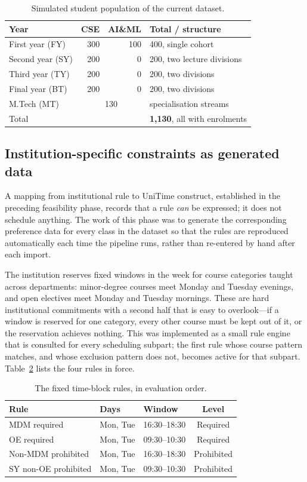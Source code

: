 \documentclass[journal]{IEEEtran}
\begin{document}
\begin{table}[t]
\centering
\caption{Simulated student population of the current dataset.}
\label{tab:population}
\footnotesize
\begin{tabular}{@{}lrrl@{}}
\toprule
Year & CSE & AI\&ML & Total / structure \\
\midrule
First year (FY) & 300 & 100 & 400, single cohort \\
Second year (SY) & 200 & 0 & 200, two lecture divisions \\
Third year (TY) & 200 & 0 & 200, two divisions \\
Final year (BT) & 200 & 0 & 200, two divisions \\
M.Tech (MT) & \multicolumn{2}{c}{130} & specialisation streams \\
\midrule
Total & \multicolumn{2}{c}{} & \textbf{1{,}130}, all with enrolments \\
\bottomrule
\end{tabular}
\end{table}

\subsection{Institution-specific constraints as generated data}
A mapping from institutional rule to UniTime construct, established in the preceding feasibility phase, records that a rule \emph{can} be expressed; it does not schedule anything. The work of this phase was to generate the corresponding preference data for every class in the dataset so that the rules are reproduced automatically each time the pipeline runs, rather than re-entered by hand after each import.

The institution reserves fixed windows in the week for course categories taught across departments: minor-degree courses meet Monday and Tuesday evenings, and open electives meet Monday and Tuesday mornings. These are hard institutional commitments with a second half that is easy to overlook---if a window is reserved for one category, every other course must be kept out of it, or the reservation achieves nothing. This was implemented as a small rule engine that is consulted for every scheduling subpart; the first rule whose course pattern matches, and whose exclusion pattern does not, becomes active for that subpart. Table~\ref{tab:blocks} lists the four rules in force.

\begin{table}[t]
\centering
\caption{The fixed time-block rules, in evaluation order.}
\label{tab:blocks}
\footnotesize
\begin{tabular}{@{}lllc@{}}
\toprule
Rule & Days & Window & Level \\
\midrule
MDM required & Mon, Tue & 16:30--18:30 & Required \\
OE required & Mon, Tue & 09:30--10:30 & Required \\
Non-MDM prohibited & Mon, Tue & 16:30--18:30 & Prohibited \\
SY non-OE prohibited & Mon, Tue & 09:30--10:30 & Prohibited \\
\bottomrule
\end{tabular}
\end{table}
\end{document}
